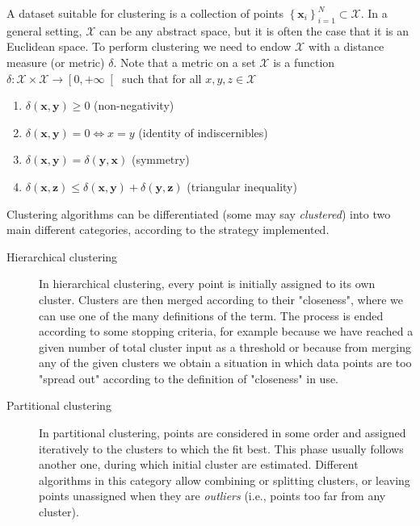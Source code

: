 \documentclass[a4paper]{article}
\begin{document}
	A dataset suitable for clustering is a collection of points $\left\{ \boldsymbol{x}_{i} \right\}_{i=1}^{N} \subset \mathcal{X}$. In a general setting, $\mathcal{X}$ can be any abstract space, but it is often the case that it is an Euclidean space. To perform clustering we need to endow $\mathcal{X}$ with a distance measure (or metric) $\delta$. Note that a metric on a set $\mathcal{X}$ is a function $\delta : \mathcal{X} \times \mathcal{X} \to \left[0,+\infty\right[$ such that for all $x, y, z \in \mathcal{X}$
	\begin{enumerate}
	\item $\delta \left( \boldsymbol{x}, \boldsymbol{y} \right)\geq 0$ (non-negativity)
	\item $\delta \left( \boldsymbol{x}, \boldsymbol{y} \right) = 0 \iff x = y$ (identity of indiscernibles)
	\item $\delta \left( \boldsymbol{x}, \boldsymbol{y} \right) = \delta \left( \boldsymbol{y}, \boldsymbol{x} \right) $ (symmetry)
	\item $ \delta \left( \boldsymbol{x}, \boldsymbol{z} \right) \leq \delta \left( \boldsymbol{x}, \boldsymbol{y} \right) + \delta \left( \boldsymbol{y}, \boldsymbol{z} \right) $ (triangular inequality)
	\end{enumerate}
	Clustering algorithms can be differentiated (some may say \textit{clustered}) into two main different categories, according to the strategy implemented.
	\begin{description}
		\item[Hierarchical clustering] In hierarchical clustering, every point is initially assigned to its own cluster. Clusters are then merged according to their "closeness", where we can use one of the many definitions of the term. The process is ended according to some stopping criteria, for example because we have reached a given number of total cluster input as a threshold or because from merging any of the given clusters we obtain a situation in which data points are too "spread out" according to the definition of "closeness" in use.
		\item[Partitional clustering] In partitional clustering, points are considered in some order and assigned iteratively to the clusters to which the fit best. This phase usually follows another one, during which initial cluster are estimated. Different algorithms in this category allow combining or splitting clusters, or leaving points unassigned when they are \textit{outliers} (i.e., points too far from any cluster).
	\end{description}
\end{document}
